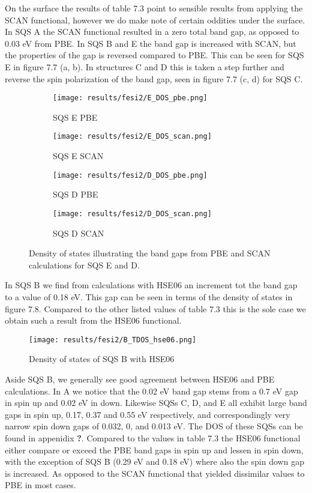 On the surface the results of table 7.3 point to sensible results from applying the SCAN functional, however we do make note of certain oddities under the surface. In SQS A the SCAN functional resulted in a zero total band gap, as opposed to 0.03 eV from PBE. In SQS B and E the band gap is increased with SCAN, but the properties of the gap is reversed compared to PBE. This can be seen for SQS E in figure 7.7 (a, b). In structures C and D this is taken a step further and reverse the spin polarization of the band gap, seen in figure 7.7 (c, d) for SQS C.
 
\begin{figure}[H]
	\begin{subfigure}{.5\textwidth}
		\texttt{[image: results/fesi2/E\_DOS\_pbe.png]}
		\caption{SQS E PBE}
	\end{subfigure}
	\begin{subfigure}{.5\textwidth}
		\texttt{[image: results/fesi2/E\_DOS\_scan.png]}
		\caption{SQS E SCAN}
	\end{subfigure}
	\begin{subfigure}{.5\textwidth}
		\texttt{[image: results/fesi2/D\_DOS\_pbe.png]}
		\caption{SQS D PBE}
	\end{subfigure}
	\begin{subfigure}{.5\textwidth}
		\texttt{[image: results/fesi2/D\_DOS\_scan.png]}
		\caption{SQS D SCAN}
	\end{subfigure}
	\caption{Density of states illustrating the band gaps from PBE and SCAN calculations for SQS E and D.}
\end{figure}


In SQS B we find from calculations with HSE06 an increment tot the band gap to a value of 0.18 eV. This gap can be seen in terms of the density of states in figure 7.8. Compared to the other listed values of table 7.3 this is the sole case we obtain such a result from the HSE06 functional.   

\begin{figure}[H]
	\centering	
	\texttt{[image: results/fesi2/B\_TDOS\_hse06.png]}
	\caption{Density of states of SQS B with HSE06}
\end{figure}


Aside SQS B, we generally see good agreement between HSE06 and PBE calculations. In A we notice that the 0.02 eV band gap stems from a 0.7 eV gap in spin up and 0.02 eV in down. Likewise SQSs C, D, and E all exhibit large band gaps in spin up, 0.17, 0.37 and 0.55 eV respectively, and correspondingly very narrow spin down gaps of 0.032, 0, and 0.013 eV. The DOS of these SQSs can be found in appenidix \textbf{?}. Compared to the values in table 7.3 the HSE06 functional either compare or exceed the PBE band gaps in spin up and lessen in spin down, with the exception of SQS B (0.29 eV and 0.18 eV) where also the spin down gap is increased. As opposed to the SCAN functional that yielded dissimilar values to PBE in most cases.

